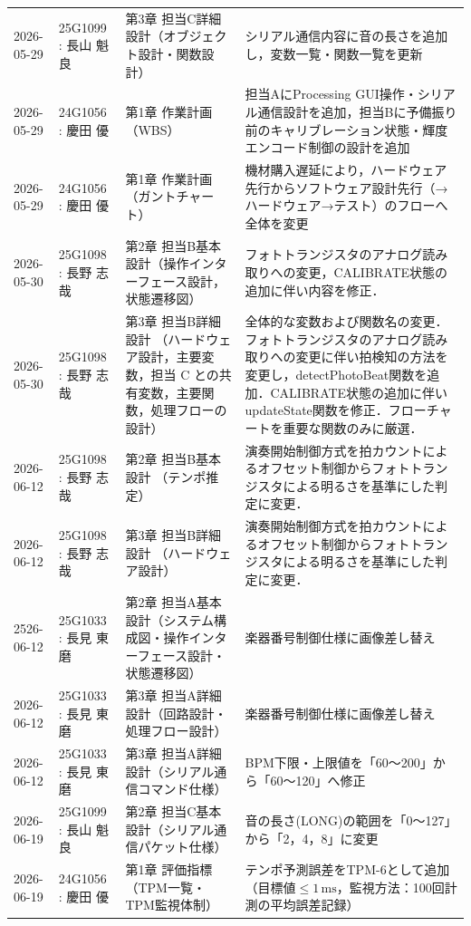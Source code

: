 \begin{longtable}{p{2.2cm}p{3.5cm}p{4cm}p{5.5cm}}
2026-05-29 & 25G1099 : 長山 魁良 & 第3章 担当C詳細設計（オブジェクト設計・関数設計） & シリアル通信内容に音の長さを追加し，変数一覧・関数一覧を更新 \\
2026-05-29 & 24G1056 : 慶田 優 & 第1章 作業計画（WBS） & 担当AにProcessing GUI操作・シリアル通信設計を追加，担当Bに予備振り前のキャリブレーション状態・輝度エンコード制御の設計を追加 \\
2026-05-29 & 24G1056 : 慶田 優 & 第1章 作業計画（ガントチャート） & 機材購入遅延により，ハードウェア先行からソフトウェア設計先行（→ハードウェア→テスト）のフローへ全体を変更 \\
2026-05-30 & 25G1098 : 長野 志哉 & 第2章 担当B基本設計（操作インターフェース設計，状態遷移図） & フォトトランジスタのアナログ読み取りへの変更，CALIBRATE状態の追加に伴い内容を修正． \\
2026-05-30 & 25G1098 : 長野 志哉 & 第3章 担当B詳細設計 （ハードウェア設計，主要変数，担当 C との共有変数，主要関数，処理フローの設計）& 全体的な変数および関数名の変更．フォトトランジスタのアナログ読み取りへの変更に伴い拍検知の方法を変更し，detectPhotoBeat関数を追加．CALIBRATE状態の追加に伴いupdateState関数を修正．フローチャートを重要な関数のみに厳選． \\
2026-06-12 & 25G1098 : 長野 志哉 & 第2章 担当B基本設計 （テンポ推定）& 演奏開始制御方式を拍カウントによるオフセット制御からフォトトランジスタによる明るさを基準にした判定に変更． \\
2026-06-12 & 25G1098 : 長野 志哉 & 第3章 担当B詳細設計 （ハードウェア設計）& 演奏開始制御方式を拍カウントによるオフセット制御からフォトトランジスタによる明るさを基準にした判定に変更． \\
2526-06-12 & 25G1033 : 長見 東磨 & 第2章 担当A基本設計（システム構成図・操作インターフェース設計・状態遷移図） & 楽器番号制御仕様に画像差し替え \\
2026-06-12 & 25G1033 : 長見 東磨 & 第3章 担当A詳細設計（回路設計・処理フロー設計） & 楽器番号制御仕様に画像差し替え \\
2026-06-12 & 25G1033 : 長見 東磨 & 第3章 担当A詳細設計（シリアル通信コマンド仕様） & BPM下限・上限値を「60〜200」から「60〜120」へ修正 \\ 
2026-06-19 & 25G1099 : 長山 魁良 & 第2章 担当C基本設計（シリアル通信パケット仕様） & 音の長さ(LONG)の範囲を「0〜127」から「2，4，8」に変更\\
2026-06-19 & 24G1056 : 慶田 優 & 第1章 評価指標（TPM一覧・TPM監視体制） & テンポ予測誤差をTPM-6として追加（目標値$\leq 1\,\mathrm{ms}$，監視方法：100回計測の平均誤差記録） \\

\end{longtable}
